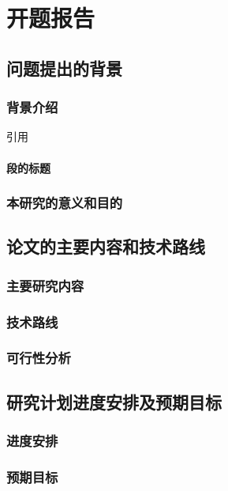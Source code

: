 \section{开题报告}

\subsection{问题提出的背景}

\subsubsection{背景介绍}
引用\cite{schweizer2013comparative}

\paragraph{段的标题}

\subsubsection{本研究的意义和目的}

\subsection{论文的主要内容和技术路线}

\subsubsection{主要研究内容}

\subsubsection{技术路线}

\subsubsection{可行性分析}

\subsection{研究计划进度安排及预期目标}

\subsubsection{进度安排}

\subsubsection{预期目标}
